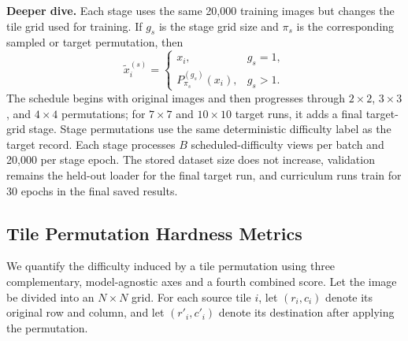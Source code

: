 \documentclass[12pt]{article}
\begin{document}
\textbf{Deeper dive.} Each stage uses the same 20,000 training images but changes the tile grid used for training. If $g_s$ is the stage grid size and $\pi_s$ is the corresponding sampled or target permutation, then
\[
  \tilde{x}_i^{(s)} =
  \begin{cases}
    x_i, & g_s=1,\\
    P_{\pi_s}^{(g_s)}(x_i), & g_s>1.
  \end{cases}
\]
The schedule begins with original images and then progresses through $2 \times 2$, $3 \times 3$, and $4 \times 4$ permutations; for $7 \times 7$ and $10 \times 10$ target runs, it adds a final target-grid stage. Stage permutations use the same deterministic difficulty label as the target record. Each stage processes $B$ scheduled-difficulty views per batch and 20,000 per stage epoch. The stored dataset size does not increase, validation remains the held-out loader for the final target run, and curriculum runs train for 30 epochs in the final saved results.

\subsection{Tile Permutation Hardness Metrics}

We quantify the difficulty induced by a tile permutation using three complementary, model-agnostic axes and a fourth combined score. Let the image be divided into an $N \times N$ grid. For each source tile $i$, let $(r_i, c_i)$ denote its original row and column, and let $(r'_i, c'_i)$ denote its destination after applying the permutation.

\begin{table}[t]
  \centering
  \scriptsize
  \caption{Tile permutation hardness metrics used in the analysis.}
  \label{tab:tile-permutation-hardness-metrics}
\end{table}
\end{document}
